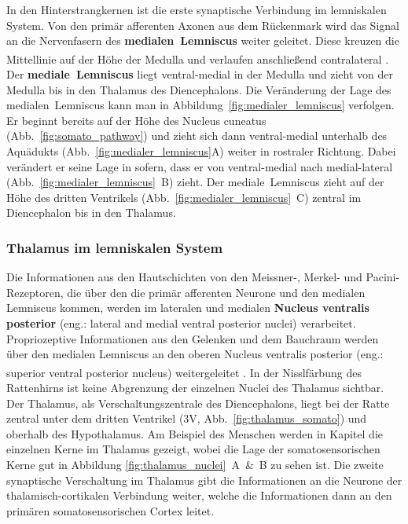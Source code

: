 \documentclass[12pt,a4paper,pdftex]{article}
\begin{document}
In den Hinterstrangkernen ist die erste synaptische Verbindung im lemniskalen System. Von den primär afferenten Axonen aus dem Rückenmark wird das Signal an die Nervenfasern des \textbf{medialen~Lemniscus}  weiter geleitet. Diese kreuzen die Mittellinie auf der Höhe der Medulla und verlaufen anschließend contralateral \textsuperscript{\cite[22]{kandel2013principles}}. 
Der \textbf{mediale~Lemniscus} liegt ventral-medial in der Medulla und zieht von der Medulla bis in den Thalamus des Diencephalons. Die Veränderung der Lage des medialen~Lemniscus  kann man in Abbildung~\ref{fig:medialer_lemniscus} verfolgen. Er beginnt bereits auf der Höhe des Nucleus cuneatus (Abb.~\ref{fig:somato_pathway}) und zieht sich dann ventral-medial unterhalb des Aquädukts (Abb.~\ref{fig:medialer_lemniscus}A) weiter in rostraler Richtung. Dabei verändert er seine Lage in sofern, dass er von ventral-medial nach medial-lateral (Abb.~\ref{fig:medialer_lemniscus}~B) zieht. Der mediale~Lemniscus zieht auf der Höhe des dritten Ventrikels (Abb.~\ref{fig:medialer_lemniscus}~C) zentral im Diencephalon bis in den Thalamus.

\subsubsection*{Thalamus im lemniskalen System}
Die Informationen aus den Hautschichten von den Meissner-, Merkel- und Pacini-Rezeptoren, die über den die primär afferenten Neurone und den medialen Lemniscus kommen, werden im lateralen und medialen \textbf{Nucleus ventralis posterior} (eng.: lateral and medial
ventral posterior nuclei)  verarbeitet. Propriozeptive Informationen aus den Gelenken und dem Bauchraum werden über den medialen Lemniscus an den oberen Nucleus ventralis posterior (eng.: superior ventral posterior nucleus) weitergeleitet \textsuperscript{\cite[22]{kandel2013principles}}. 
In der Nisslfärbung des Rattenhirns ist keine Abgrenzung der einzelnen Nuclei des Thalamus sichtbar. Der Thalamus, als Verschaltungszentrale des Diencephalons, liegt bei der Ratte zentral unter dem dritten Ventrikel (3V, Abb.~\ref{fig:thalamus_somato}) und oberhalb des Hypothalamus. 
Am Beispiel des Menschen werden in Kapitel \label{subsubsec:thalamus} die einzelnen Kerne im Thalamus gezeigt, wobei die Lage der somatosensorischen Kerne gut in Abbildung \ref{fig:thalamus_nuclei}~A~\&~B zu sehen ist.
Die zweite synaptische Verschaltung im Thalamus gibt die Informationen an die Neurone der thalamisch-cortikalen Verbindung weiter, welche die Informationen dann an den primären somatosensorischen Cortex leitet.
\end{document}
